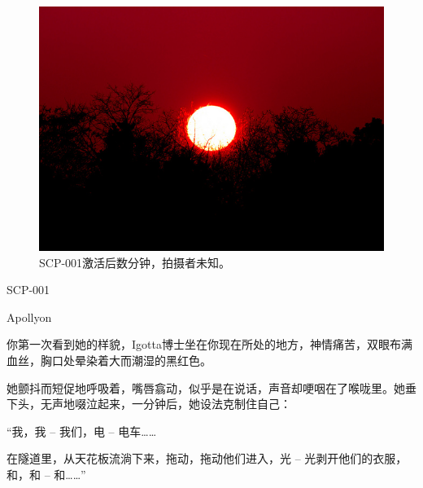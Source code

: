 \hr


\newpage



\hr


\begin{figure}[H]
	\centering
	\includegraphics[width=0.5\linewidth]{images/SCP-001-when-night-breaks.jpg}
	\caption*{SCP-001激活后数分钟，拍摄者未知。}
\end{figure}

SCP-001

Apollyon




\begin{scpbox}

你第一次看到她的样貌，Igotta博士坐在你现在所处的地方，神情痛苦，双眼布满血丝，胸口处晕染着大而潮湿的黑红色。

她颤抖而短促地呼吸着，嘴唇翕动，似乎是在说话，声音却哽咽在了喉咙里。她垂下头，无声地啜泣起来，一分钟后，她设法克制住自己：

\end{scpbox}

\begin{scpdialog}

“我，我 – 我们，电 – 电车……

在隧道里，从天花板流淌下来，拖动，拖动他们进入，光 – 光剥开他们的衣服，和，和 – 和……”

\end{scpdialog}

